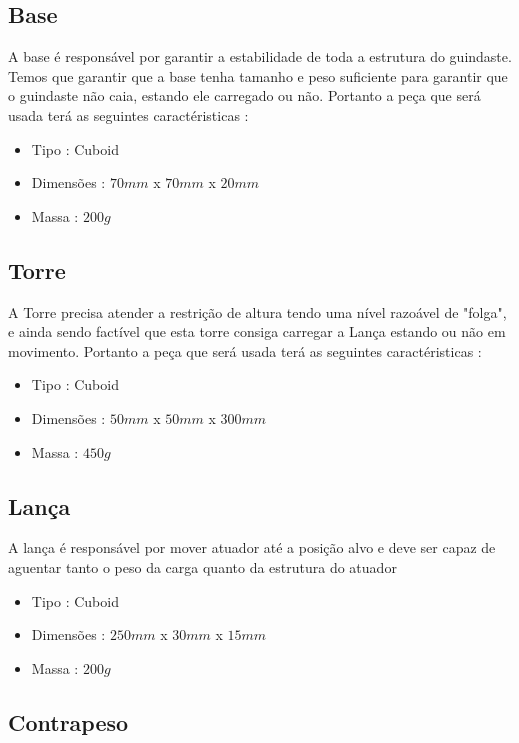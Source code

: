 \documentclass{article}
\begin{document}
    \subsection{Base}

        A base é responsável por garantir a estabilidade de toda a estrutura do guindaste. Temos que garantir 
        que a base tenha tamanho e peso suficiente para garantir que o guindaste não caia, estando ele 
        carregado ou não. Portanto a peça que será usada terá as seguintes caractéristicas :
        \begin{itemize}
            \item Tipo : Cuboid
            \item Dimensões : \(70mm\) x \(70mm\) x \(20mm\)
            \item Massa : \(200g\)
        \end{itemize}
    \subsection{Torre}

        A Torre precisa atender a restrição de altura tendo uma nível razoável de "folga", e ainda sendo factível 
        que esta torre consiga carregar a Lança estando ou não em movimento. Portanto a peça que será usada terá 
        as seguintes caractéristicas :
        \begin{itemize}
            \item Tipo : Cuboid
            \item Dimensões : \(50mm\) x \(50mm\) x \(300mm\)
            \item Massa : \(450g\)
        \end{itemize}
    \subsection{Lança}

        A lança é responsável por mover atuador até a posição alvo e deve ser capaz de aguentar tanto o 
        peso da carga quanto da estrutura do atuador
        \begin{itemize}
            \item Tipo : Cuboid
            \item Dimensões : \(250mm\) x \(30mm\) x \(15mm\)
            \item Massa : \(200g\)
        \end{itemize}
    \subsection{Contrapeso}
\end{document}

